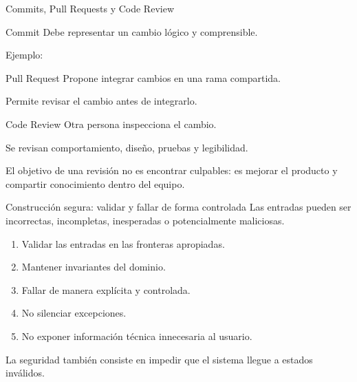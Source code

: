 \documentclass[11pt,aspectratio=169]{beamer}
\begin{document}
\begin{frame}{Commits, Pull Requests y Code Review}
\begin{threecol}
  \begin{block}{Commit}
    Debe representar un cambio lógico y comprensible.
    \par\medskip Ejemplo:\par {}
  \end{block}
\nextcol
  \begin{block}{Pull Request}
    Propone integrar cambios en una rama compartida.
    \par\medskip Permite revisar el cambio antes de integrarlo.
  \end{block}
\nextcol
  \begin{block}{Code Review}
    Otra persona inspecciona el cambio.
    \par\medskip Se revisan comportamiento, diseño, pruebas y legibilidad.
  \end{block}
\end{threecol}

\begin{callout}[halign=center]
  El objetivo de una revisión no es encontrar culpables: es mejorar el
  producto y compartir conocimiento dentro del equipo.
\end{callout}
\end{frame}

\begin{frame}{Construcción segura: validar y fallar de forma controlada}
Las entradas pueden ser incorrectas, incompletas, inesperadas o
potencialmente maliciosas.

\begin{twocol}[split=0.58]
  \begin{enumerate}\small
    \item Validar las entradas en las fronteras apropiadas.
    \item Mantener invariantes del dominio.
    \item Fallar de manera explícita y controlada.
    \item No silenciar excepciones.
    \item No exponer información técnica innecesaria al usuario.
  \end{enumerate}
\nextcol
  \begin{notebox}
    \par
  \end{notebox}
\end{twocol}

\begin{callout}[halign=center]
  La seguridad también consiste en impedir que el sistema llegue a estados inválidos.
\end{callout}
\end{frame}
\end{document}
